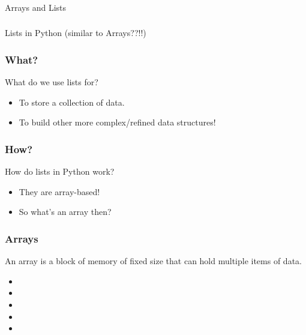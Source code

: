 \begin{frame}[fragile]\frametitle{}
\begin{center}
{\Large Arrays and Lists}
\end{center}

\end{frame}

\begin{frame}[fragile]\frametitle{}
\begin{center}
{\Large Lists in Python (similar to Arrays??!!)}
\end{center}

\end{frame}

\begin{frame}
	\frametitle{What?}
		What do we use lists for?	

		\begin{itemize}
			\item To store a collection of data.
			\item To build other more complex/refined data structures!
		\end{itemize}
\end{frame}

\begin{frame}
	\frametitle{How?}
		How do lists in Python work?

		\begin{itemize}
			\item 		They are array-based!
			\item   	So what's an array then?
	\end{itemize}
\end{frame}




\begin{frame}
	\frametitle{Arrays}
		An array is a block of memory of fixed size that can hold multiple items of data.


	

			\begin{itemize}
			\item 	
			\item
			\item 	
			\item
			\item 	
	\end{itemize}


\end{frame}

